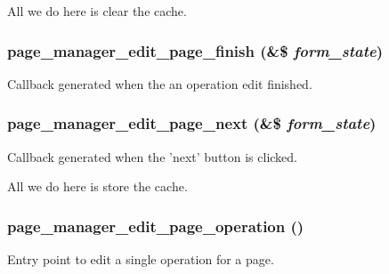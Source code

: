 All we do here is clear the cache. \hypertarget{page__manager_8admin_8inc_adda934adb211c15b7ffb8659158f4c8d}{
\subsubsection[{page\_\-manager\_\-edit\_\-page\_\-finish}]{\setlength{\rightskip}{0pt plus 5cm}page\_\-manager\_\-edit\_\-page\_\-finish (\&\$ {\em form\_\-state})}}
\label{page__manager_8admin_8inc_adda934adb211c15b7ffb8659158f4c8d}
Callback generated when the an operation edit finished. \hypertarget{page__manager_8admin_8inc_a50dd59f9db5cde973f5120337b6f4026}{
\subsubsection[{page\_\-manager\_\-edit\_\-page\_\-next}]{\setlength{\rightskip}{0pt plus 5cm}page\_\-manager\_\-edit\_\-page\_\-next (\&\$ {\em form\_\-state})}}
\label{page__manager_8admin_8inc_a50dd59f9db5cde973f5120337b6f4026}
Callback generated when the 'next' button is clicked.

All we do here is store the cache. \hypertarget{page__manager_8admin_8inc_a88fc713de52b4be208360499f8225ac1}{
\subsubsection[{page\_\-manager\_\-edit\_\-page\_\-operation}]{\setlength{\rightskip}{0pt plus 5cm}page\_\-manager\_\-edit\_\-page\_\-operation ()}}
\label{page__manager_8admin_8inc_a88fc713de52b4be208360499f8225ac1}
Entry point to edit a single operation for a page.


